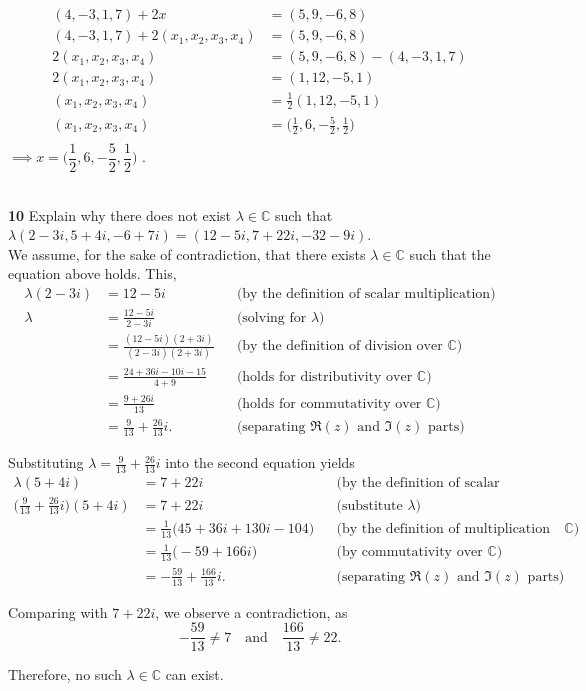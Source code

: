 \documentclass{article}
\begin{document}
\begin{align*}
    (4, -3, 1, 7) + 2x &= (5, 9, -6, 8)\\
    (4, -3, 1, 7) + 2(x_{1}, x_{2}, x_{3}, x_{4}) &= (5, 9, -6, 8)\\
    2(x_{1}, x_{2}, x_{3}, x_{4}) &= (5, 9, -6, 8) - (4, -3, 1, 7)\\
    2(x_{1}, x_{2}, x_{3}, x_{4}) &= (1, 12, -5, 1)\\
    (x_{1}, x_{2}, x_{3}, x_{4}) &= \frac{1}{2}(1, 12, -5, 1)\\
    (x_{1}, x_{2}, x_{3}, x_{4}) &= \Big(\frac{1}{2}, 6, -\frac{5}{2}, \frac{1}{2}\Big)\\
\end{align*}
$\implies x = \Big(\dfrac{1}{2}, 6, -\dfrac{5}{2}, \dfrac{1}{2}\Big)$ .\\\\

\color{black}

\noindent \textbf{10} \hspace{3 mm} Explain why there does not exist $\lambda \in \mathbb{C}$ such that $\lambda(2 - 3i, 5 + 4i, -6 + 7i) = (12 - 5i, 7 + 22i, -32 - 9i)$.\color{red}\\

\noindent We assume, for the sake of contradiction, that there exists $\lambda \in \mathbb{C}$ such that the equation above holds. This,
    \begin{align*}
        \lambda(2 - 3i) &= 12 - 5i &&\text{(by the definition of scalar multiplication)} \\
        \lambda &= \frac{12 - 5i}{2 - 3i} &&\text{(solving for $\lambda$)} \\
        &= \frac{(12 - 5i)(2 + 3i)}{(2 - 3i)(2 + 3i)} &&\text{(by the definition of division over $\mathbb{C}$)} \\
        &= \frac{24 + 36i - 10i - 15}{4 + 9} &&\text{(holds for distributivity over $\mathbb{C}$)} \\
        &= \frac{9 + 26i}{13} &&\text{(holds for commutativity over $\mathbb{C}$)} \\
        &= \frac{9}{13} + \frac{26}{13}i. &&\text{(separating $\Re({z})$ and $\Im({z})$ parts)}
    \end{align*}

    Substituting $\lambda = \frac{9}{13} + \frac{26}{13}i$ into the second equation yields
    \begin{align*}
        \lambda(5 + 4i) &= 7 + 22i &&\text{(by the definition of scalar multiplication)} \\
        \Big(\frac{9}{13} + \frac{26}{13}i\Big)(5 + 4i) &= 7 + 22i &&\text{(substitute $\lambda$)} \\
        &= \frac{1}{13}\Big(45 + 36i + 130i - 104\Big) &&\text{(by the definition of multiplication over $\mathbb{C}$)} \\
        &= \frac{1}{13}\Big(-59 + 166i\Big) &&\text{(by commutativity over $\mathbb{C}$)} \\
        &= -\frac{59}{13} + \frac{166}{13}i. &&\text{(separating $\Re({z})$ and $\Im({z})$ parts)}
    \end{align*}

    Comparing with $7 + 22i$, we observe a contradiction, as
    \[
    -\frac{59}{13} \neq 7 \quad \text{and} \quad \frac{166}{13} \neq 22.
    \]

    Therefore, no such $\lambda \in \mathbb{C}$ can exist.

\color{black}
\end{document}
